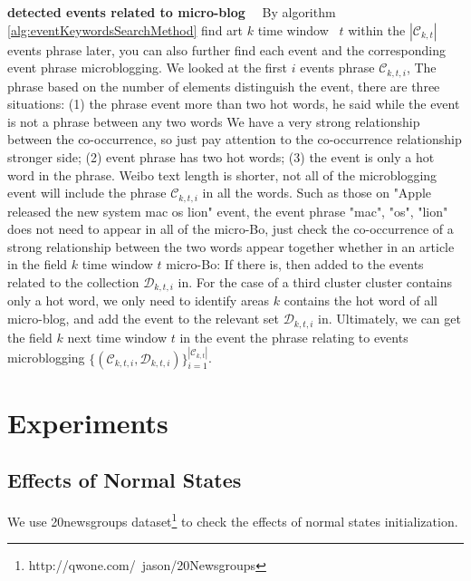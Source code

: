 \documentclass[conference,compsoc]{IEEEtran}
\begin{document}
\textbf{detected events related to micro-blog}
\ \
By algorithm \ref{alg:eventKeywordsSearchMethod} find art \(k \) time window \ \(t \) within the \(| \mathcal{C}_{k, t} | \) events phrase later, you can also further find each event and the corresponding event phrase microblogging.
We looked at the first \(i \) events phrase \(\mathcal{C}_{k, t, i} \),
The phrase based on the number of elements distinguish the event, there are three situations: (1) the phrase event more than two hot words, he said while the event is not a phrase between any two words We have a very strong relationship between the co-occurrence, so just pay attention to the co-occurrence relationship stronger side; (2) event phrase has two hot words; (3) the event is only a hot word in the phrase.
Weibo text length is shorter, not all of the microblogging event will include the phrase \(\mathcal{C}_{k, t, i} \) in all the words.
Such as those on "Apple released the new system mac os lion" event, the event phrase "mac", "os", "lion" does not need to appear in all of the micro-Bo, just check the co-occurrence of a strong relationship between the two words appear together whether in an article in the field \(k \) time window \(t \) micro-Bo: If there is, then added to the events related to the collection \(\mathcal{D}_{k, t, i} \) in.
For the case of a third cluster cluster contains only a hot word, we only need to identify areas \(k \) contains the hot word of all micro-blog, and add the event to the relevant set \(\mathcal{D}_{k, t, i} \) in.
Ultimately, we can get the field \(k \) next time window \(t \) in the event the phrase relating to events microblogging \(\{(\mathcal{C}_{k, t, i}, \mathcal{D}_{k, t, i}) \}_{i=1}^{| \mathcal{C}_{k, t} |} \).

\section{Experiments}
\subsection{Effects of Normal States}
We use 20newsgroups\cite{lang1995newsweeder} dataset\footnote{http://qwone.com/~jason/20Newsgroups} to check the effects of normal states initialization.
\end{document}
